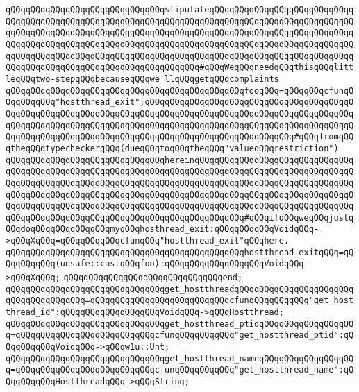 \verb|qQQqqQQqqQQqqQQqqQQqqQQqqQQqqQQqstipulateqQQqqQQqqQQqqQQqqQQqqQQqqQQqqQQqqQQqqQQqqQQqqQQqqQQqqQQqqQQqqQQqqQQqqQQqqQQqqQQqqQQqqQQqqQQqqQQqqQQqqQQqqQQqqQQqqQQqqQQqqQQqqQQqqQQqqQQqqQQqqQQqqQQqqQQqqQQqqQQqqQQqqQQqqQQqqQQqqQQqqQQqqQQqqQQqqQQqqQQqqQQqqQQqqQQqqQQqqQQqqQQqqQQqqQQqqQQqqQQqqQQqqQQqqQQqqQQqqQQqqQQqqQQqqQQqqQQqqQQqqQQqqQQqqQQqqQQqqQQqqQQqqQQqqQQqqQQqqQQqqQQqqQQqqQQqqQQqqQQqqQQqqQQq#qQQqWeqQQqneedqQQqthisqQQqlittleqQQqtwo-stepqQQqbecauseqQQqwe'llqQQqgetqQQqcomplaints|\newline
\verb|qQQqqQQqqQQqqQQqqQQqqQQqqQQqqQQqqQQqqQQqqQQqqQQqfooqQQq=qQQqqQQqcfunqQQqqQQqqQQq"hostthread_exit";qQQqqQQqqQQqqQQqqQQqqQQqqQQqqQQqqQQqqQQqqQQqqQQqqQQqqQQqqQQqqQQqqQQqqQQqqQQqqQQqqQQqqQQqqQQqqQQqqQQqqQQqqQQqqQQqqQQqqQQqqQQqqQQqqQQqqQQqqQQqqQQqqQQqqQQqqQQqqQQqqQQqqQQqqQQqqQQqqQQqqQQqqQQqqQQqqQQqqQQqqQQqqQQqqQQqqQQqqQQqqQQqqQQqqQQqqQQqqQQq#qQQqfromqQQqtheqQQqtypecheckerqQQq(dueqQQqtoqQQqtheqQQq"valueqQQqrestriction")|\newline
\verb|qQQqqQQqqQQqqQQqqQQqqQQqqQQqqQQqhereinqQQqqQQqqQQqqQQqqQQqqQQqqQQqqQQqqQQqqQQqqQQqqQQqqQQqqQQqqQQqqQQqqQQqqQQqqQQqqQQqqQQqqQQqqQQqqQQqqQQqqQQqqQQqqQQqqQQqqQQqqQQqqQQqqQQqqQQqqQQqqQQqqQQqqQQqqQQqqQQqqQQqqQQqqQQqqQQqqQQqqQQqqQQqqQQqqQQqqQQqqQQqqQQqqQQqqQQqqQQqqQQqqQQqqQQqqQQqqQQqqQQqqQQqqQQqqQQqqQQqqQQqqQQqqQQqqQQqqQQqqQQqqQQqqQQqqQQqqQQqqQQqqQQqqQQqqQQqqQQqqQQqqQQqqQQqqQQqqQQqqQQqqQQqqQQqqQQqqQQq#qQQqifqQQqweqQQqjustqQQqdoqQQqqQQqqQQqqQQqmyqQQqhosthread_exit:qQQqqQQqqQQqVoidqQQq->qQQqXqQQq=qQQqqQQqqQQqcfunqQQq"hostthread_exit"qQQqhere.|\newline
\verb|qQQqqQQqqQQqqQQqqQQqqQQqqQQqqQQqqQQqqQQqqQQqqQQqhostthread_exitqQQq=qQQqqQQqqQQq(unsafe::castqQQqfoo):qQQqqQQqqQQqqQQqqQQqVoidqQQq->qQQqXqQQq;|\newline
\verb|qQQqqQQqqQQqqQQqqQQqqQQqqQQqqQQqend;|\newline
\newline
\verb|qQQqqQQqqQQqqQQqqQQqqQQqqQQqqQQqget_hostthreadqQQqqQQqqQQqqQQqqQQqqQQqqQQqqQQqqQQqqQQq=qQQqqQQqqQQqqQQqqQQqqQQqqQQqcfunqQQqqQQqqQQq"get_hostthread_id":qQQqqQQqqQQqqQQqqQQqVoidqQQq->qQQqHostthread;|\newline
\verb|qQQqqQQqqQQqqQQqqQQqqQQqqQQqqQQqget_hostthread_ptidqQQqqQQqqQQqqQQqqQQq=qQQqqQQqqQQqqQQqqQQqqQQqqQQqcfunqQQqqQQqqQQq"get_hostthread_ptid":qQQqqQQqqQQqVoidqQQq->qQQqw1u::Unt;|\newline
\newline
\verb|qQQqqQQqqQQqqQQqqQQqqQQqqQQqqQQqget_hostthread_nameqQQqqQQqqQQqqQQqqQQq=qQQqqQQqqQQqqQQqqQQqqQQqqQQqcfunqQQqqQQqqQQq"get_hostthread_name":qQQqqQQqqQQqHostthreadqQQq->qQQqString;|\newline
